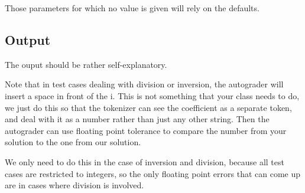 Those parameters for which no value is given will rely on the defaults.




\subsection*{Output}

The ouput should be rather self-explanatory.

Note that in test cases dealing with division or inversion,
the autograder will insert a space in front of the i.
This is not something that your class needs to do,
we just do this so that the tokenizer can see the coefficient as a separate token,
and deal with it as a number rather than just any other string.
Then the autograder can use floating point tolerance to
compare the number from your solution
to the one from our solution.

We only need to do this in the case of inversion and division,
because all test cases are restricted to integers,
so the only floating point errors that can come up
are in cases where division is involved.

